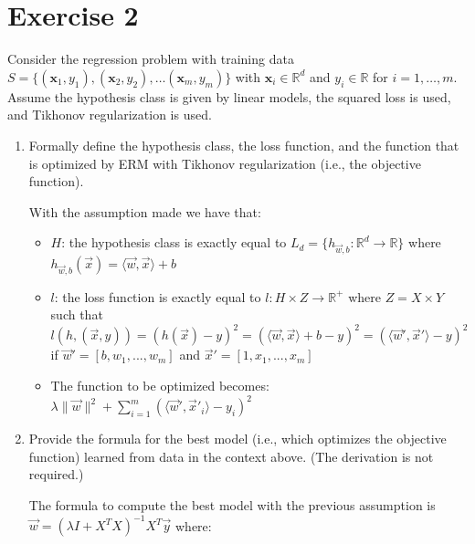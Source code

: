 \documentclass[a4paper,11pt,oneside]{book}
\begin{document}
\section{Exercise 2}
Consider the regression problem with training data $S = \{(\mathbf{x}_1, y_1), (\mathbf{x}_2, y_2), \ldots (\mathbf{x}_m, y_m)\}$ with $\mathbf{x}_i \in \mathbb{R}^d$ and $y_i \in \mathbb{R}$ for $i = 1,\ldots,m$. Assume the hypothesis class is given by linear models, the squared loss is used, and Tikhonov regularization is used.
\begin{enumerate}
\item Formally define the hypothesis class, the loss function, and the function that is optimized by ERM with Tikhonov regularization (i.e., the objective function).
    \begin{solution}
        With the assumption made we have that:
        \begin{itemize}
        \item $H$: the hypothesis class is exactly equal to $L_d = \{h_{\vec{w},b}: \mathbb{R}^d \to \mathbb{R}\}$ where $h_{\vec{w},b}(\vec{x}) = \langle \vec{w},\vec{x} \rangle +b$
        \item $l$: the loss function is exactly equal to $l: H\times Z \to \mathbb{R}^+$ where $Z = X\times Y$ such that $l(h,(\vec{x},y)) = (h(\vec{x}) - y)^2 = (\langle \vec{w},\vec{x} \rangle + b - y)^2 = (\langle \vec{w}',\vec{x}' \rangle - y)^2$ if $\vec{w}' = [b,w_1,...,w_m]$ and $\vec{x}' = [1,x_1,...,x_m]$
        \item The function to be optimized becomes: $\lambda\|\vec{w}\|^2 + \sum_{i=1}^m(\langle \vec{w}',\vec{x}'_i \rangle - y_i)^2$
        \end{itemize}
    \end{solution}
\item Provide the formula for the best model (i.e., which optimizes the objective function) learned from data in the context above. (The derivation is not required.)
    \begin{solution}
        The formula to compute the best model with the previous assumption is $\vec{w} = (\lambda I + X^TX)^{-1}X^T\vec{y}$ where:
        

\end{solution}
\end{enumerate}
\end{document}
